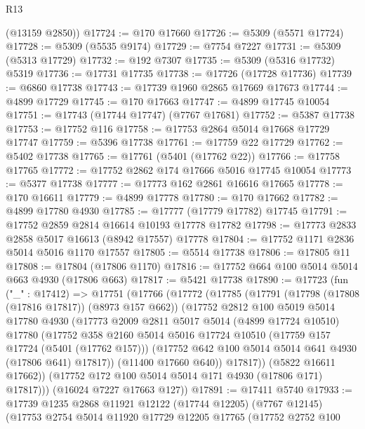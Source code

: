\begin{lexlean}{R13}
\begin{coremodule}
      (@13159 @2850))
@17724 := @170 @17660
@17726 := @5309 (@5571 @17724)
@17728 := @5309 (@5535 @9174)
@17729 := @7754 @7227
@17731 := @5309 (@5313 @17729)
@17732 := @192 @7307
@17735 := @5309 (@5316 @17732) @5319
@17736 := @17731 @17735
@17738 := @17726 (@17728 @17736)
@17739 := @6860 @17738
@17743 := @17739 @1960 @2865 @17669 @17673
@17744 := @4899 @17729
@17745 := @170 @17663
@17747 := @4899 @17745 @10054
@17751 := @17743 (@17744 @17747) (@7767 @17681)
@17752 := @5387 @17738
@17753 := @17752 @116
@17758 := @17753 @2864 @5014 @17668 @17729 @17747
@17759 := @5396 @17738
@17761 := @17759 @22 @17729
@17762 := @5402 @17738
@17765 := @17761 (@5401 (@17762 @22))
@17766 := @17758 @17765
@17772 := @17752 @2862 @174 @17666 @5016 @17745 @10054
@17773 := @5377 @17738
@17777 := @17773 @162 @2861 @16616 @17665
@17778 := @170 @16611
@17779 := @4899 @17778
@17780 := @170 @17662
@17782 := @4899 @17780 @4930
@17785 := @17777 (@17779 @17782) @17745
@17791 := @17752 @2859 @2814 @16614 @10193 @17778 @17782
@17798 := @17773 @2833 @2858 @5017 @16613 (@8942 @17557) @17778
@17804 := @17752 @1171 @2836 @5014 @5016 @1170 @17557
@17805 := @5514 @17738
@17806 := @17805 @11
@17808 := @17804 (@17806 @1170)
@17816 := @17752 @664 @100 @5014 @5014 @663 @4930 (@17806 @663)
@17817 := @5421 @17738
@17890 := @17723
    (fun ("_" : @17412) =>
    @17751
      (@17766
        (@17772
          (@17785
            (@17791
              (@17798 (@17808 (@17816 @17817)) (@8973 @157 @662))
              (@17752
                @2812
                @100
                @5019
                @5014
                @17780
                @4930
                (@17773
                  @2009
                  @2811
                  @5017
                  @5014
                  (@4899 @17724 @10510)
                  @17780
                  (@17752
                    @358
                    @2160
                    @5014
                    @5016
                    @17724
                    @10510
                    (@17759 @157 @17724 (@5401 (@17762 @157)))
                    (@17752 @642 @100 @5014 @5014 @641 @4930 (@17806 @641) @17817))
                  (@11400 @17660 @640))
                @17817))
            (@5822 @16611 @17662))
          (@17752 @172 @100 @5014 @5014 @171 @4930 (@17806 @171) @17817)))
      (@16024 @7227 @17663 @127))
@17891 := @17411 @5740
@17933 := @17739
    @1235
    @2868
    @11921
    @12122
    (@17744 @12205)
    (@7767 @12145)
    (@17753
      @2754
      @5014
      @11920
      @17729
      @12205
      @17765
      (@17752
        @2752
        @100

\end{coremodule}
\end{lexlean}
